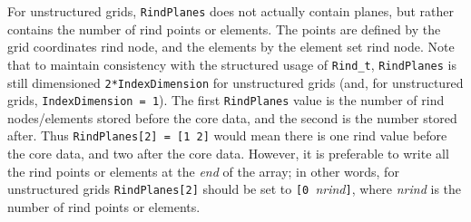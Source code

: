 For unstructured grids, \texttt{RindPlanes} does not actually contain
planes, but rather contains the number of rind points or elements.
The points are defined by the grid coordinates rind node, and the
elements by the element set rind node.
Note that to maintain consistency with the structured usage
of \texttt{Rind\_t}, \texttt{RindPlanes} is still dimensioned
\texttt{2*IndexDimension} for unstructured grids (and, for unstructured
grids, \texttt{IndexDimension = 1}).
The first \texttt{RindPlanes} value is the number of rind nodes/elements
stored before the core data, and the second is the number stored after.
Thus \texttt{RindPlanes[2] = [1 2]} would mean there is one rind value
before the core data, and two after the core data.
However, it is preferable to write all the rind points or elements at
the \emph{end} of the array; in other words, for unstructured grids
\texttt{RindPlanes[2]} should be set to \texttt{[0 }\textit{nrind}\texttt{]},
where \textit{nrind} is the number of rind points or elements.
